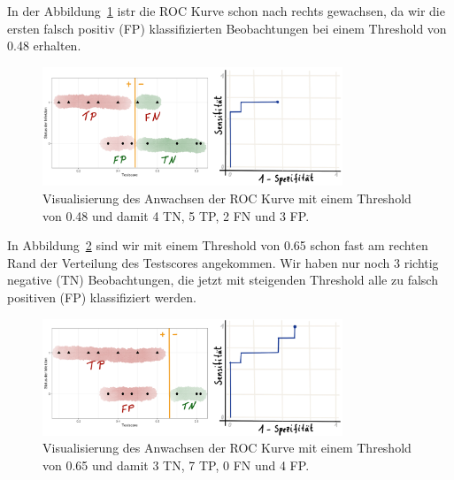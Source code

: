 \documentclass[
  letterpaper,
]{scrbook}
\begin{document}
In der Abbildung~\ref{fig-roc-drawn-2} istr die ROC Kurve schon nach
rechts gewachsen, da wir die ersten falsch positiv (FP) klassifizierten
Beobachtungen bei einem Threshold von 0.48 erhalten.

\begin{figure}

{\centering \includegraphics[width=0.8\textwidth,height=\textheight]{./images/diag-roc-02.png}

}

\caption{\label{fig-roc-drawn-2}Visualisierung des Anwachsen der ROC
Kurve mit einem Threshold von 0.48 und damit 4 TN, 5 TP, 2 FN und 3 FP.}

\end{figure}

In Abbildung~\ref{fig-roc-drawn-3} sind wir mit einem Threshold von 0.65
schon fast am rechten Rand der Verteilung des Testscores angekommen. Wir
haben nur noch 3 richtig negative (TN) Beobachtungen, die jetzt mit
steigenden Threshold alle zu falsch positiven (FP) klassifiziert werden.

\begin{figure}

{\centering \includegraphics[width=0.8\textwidth,height=\textheight]{./images/diag-roc-03.png}

}

\caption{\label{fig-roc-drawn-3}Visualisierung des Anwachsen der ROC
Kurve mit einem Threshold von 0.65 und damit 3 TN, 7 TP, 0 FN und 4 FP.}

\end{figure}

{}
\end{document}
